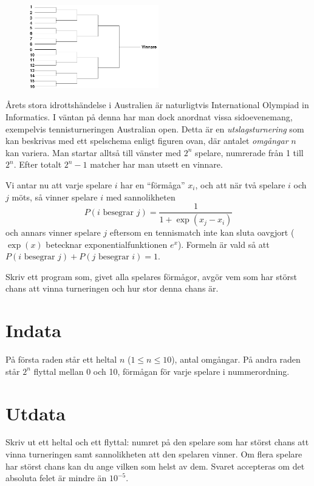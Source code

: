 

\begin{figure}[!h]
\begin{center}
\includegraphics[width=0.5\textwidth]{australian.png}
\end{center}
\end{figure}

Årets stora idrottshändelse i Australien är naturligtvis International Olympiad in Informatics. I väntan på denna har man dock anordnat vissa sidoevenemang, exempelvis tennisturneringen Australian open. Detta är en {\em utslagsturnering} som kan
beskrivas med ett spelschema enligt figuren ovan, där antalet {\em omgångar} $n$ kan variera. Man startar alltså till vänster med $2^n$ spelare, numrerade från 1 till $2^n$. Efter totalt $2^n - 1$ matcher har man utsett en vinnare.

Vi antar nu att varje spelare $i$ har en ``förmåga'' $x_i$, och att när två spelare $i$ och $j$ möts, så vinner spelare $i$ med sannolikheten
\begin{displaymath}
P(i \text{ besegrar } j) = \frac{1}{1+\exp(x_j-x_i)}
\end{displaymath}
och annars vinner spelare $j$ eftersom en tennismatch inte kan sluta
oavgjort ($\exp(x)$ betecknar exponentialfunktionen $e^x$). Formeln är vald så att $P(i \text{ besegrar } j)+P(j \text{ besegrar } i)=1$.

Skriv ett program som, givet alla spelares förmågor, avgör vem som har
störst chans att vinna turneringen och hur stor denna chans är.


\section*{Indata}
På första raden står ett heltal $n$ ($1 \leq n \leq 10$), antal omgångar.
På andra raden står $2^n$ flyttal mellan 0 och 10, förmågan för
varje spelare i nummerordning.

\section*{Utdata}
Skriv ut ett heltal och ett flyttal: numret på den spelare som har
störst chans att vinna turneringen samt sannolikheten att den spelaren
vinner. Om flera spelare har störst chans kan du ange vilken som helst
av dem. Svaret accepteras om det absoluta felet är mindre än $10^{-5}$.


